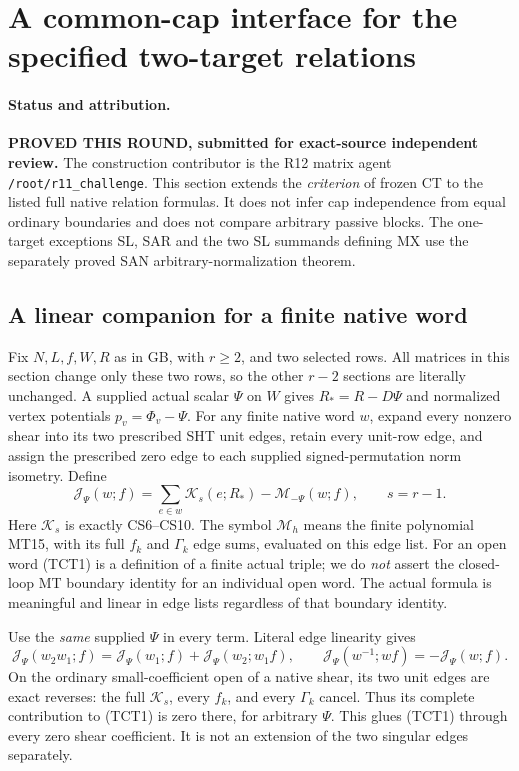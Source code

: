\section{A common-cap interface for the specified two-target relations}
\label{sec:r12-two-target-common-cap}

\paragraph{Status and attribution.}
\textbf{PROVED THIS ROUND, submitted for exact-source independent review.}
The construction contributor is the R12 matrix agent
\texttt{/root/r11\_challenge}.  This section extends the \emph{criterion}
of frozen CT to the listed full native relation formulas.  It does
not infer cap independence from equal ordinary boundaries and does
not compare arbitrary passive blocks.  The one-target exceptions
SL, SAR and the two SL summands defining MX use the separately proved
SAN arbitrary-normalization theorem.

\subsection{A linear companion for a finite native word}

Fix $N,L,f,W,R$ as in GB, with $r\ge2$, and two selected rows.
All matrices in this section change only these two rows, so the
other $r-2$ sections are literally unchanged.  A supplied actual
scalar $\Psi$ on $W$ gives $R_*=R-D\Psi$ and normalized vertex
potentials $p_v=\Phi_v-\Psi$.  For any finite native word $w$,
expand every nonzero shear into its two prescribed SHT unit edges,
retain every unit-row edge, and assign the prescribed zero edge to
each supplied signed-permutation norm isometry.  Define
\[
 \mathcal J_\Psi(w;f)=\sum_{e\in w}\mathcal K_s(e;R_*)
                    -\mathcal M_{-\Psi}(w;f),\qquad s=r-1.
 \tag{TCT1}
\]
Here $\mathcal K_s$ is exactly CS6--CS10.  The symbol
$\mathcal M_h$ means the finite polynomial MT15, with its full
$f_k$ and $\Gamma_k$ edge sums, evaluated on this edge list.
For an open word (TCT1) is a definition of a finite actual triple;
we do \emph{not} assert the closed-loop MT boundary identity for an
individual open word.  The actual formula is meaningful and linear
in edge lists regardless of that boundary identity.

Use the \emph{same} supplied $\Psi$ in every term.  Literal edge
linearity gives
\[
 \mathcal J_\Psi(w_2w_1;f)
 =\mathcal J_\Psi(w_1;f)+\mathcal J_\Psi(w_2;w_1f),
 \qquad \mathcal J_\Psi(w^{-1};wf)=-\mathcal J_\Psi(w;f).
 \tag{TCT2}
\]
On the ordinary small-coefficient open of a native shear, its two
unit edges are exact reverses: the full $\mathcal K_s$, every
$f_k$, and every $\Gamma_k$ cancel.  Thus its complete contribution
to (TCT1) is zero there, for arbitrary $\Psi$.  This glues (TCT1)
through every zero shear coefficient.  It is not an extension of
the two singular edges separately.

